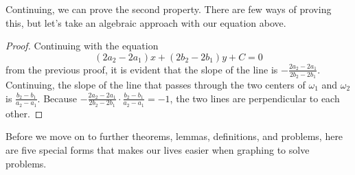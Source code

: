 \documentclass[../../main.tex]{subfiles}
\begin{document}
Continuing, we can prove the second property. There are few ways of
proving this, but let's take an algebraic approach with our equation
above.

\begin{proof}
Continuing with the equation
\[
(2a_2 - 2a_1) x + (2b_2 - 2b_1) y + C = 0
\]
from the previous proof, it is evident that the slope of the line
is $-\frac{2a_2 - 2a_1}{2b_2 - 2b_1}$. Continuing, the slope of
the line that passes through the two centers of $\omega_1$ and
$\omega_2$ is $\frac{b_2 - b_1}{a_2 - a_1}$. Because
$-\frac{2a_2 - 2a_1}{2b_2 - 2b_1} \cdot \frac{b_2 - b_1}{a_2 - a_1}
= -1$, the two lines are perpendicular to each other.
\end{proof}

Before we move on to further theorems, lemmas, definitions, and
problems, here are five special forms that makes our lives easier
when graphing to solve problems.

\begin{minipage}{0.48\textwidth}
\begin{figure}[H]
\centering
{}
\end{figure}
\end{minipage}
\hfill
\begin{minipage}{0.48\textwidth}
\begin{figure}[H]
\centering
{}
\end{figure}
\end{minipage}
\end{document}
